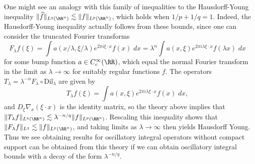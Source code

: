 One might see an analogy with this family of inequalities to the Hausdorff-Young inequality $\| \widehat{f} \|_{L^q(\RR^n)} \lesssim \| f \|_{L^p(\RR^n)}$, which holds when $1/p + 1/q = 1$. Indeed, the Hausdorff-Young inequality actually follows from these bounds, since one can consider the truncated Fourier transforms
%
\[ F_\lambda f(\xi) = \int a(x/\lambda,\xi/\lambda) e^{2 \pi i \xi \cdot x} f(x)\; dx = \lambda^n \int a(x,\xi) e^{2 \pi i \lambda \xi \cdot x} f(\lambda x)\; dx \]
%
for some bump function $a \in C_c^\infty(\RR)$, which equal the normal Fourier transform in the limit as $\lambda \to \infty$ for suitably regular functions $f$. The operators $T_\lambda = \lambda^{-n} F_\lambda \circ \text{Dil}_\lambda$ are given by
%
\[ T_\lambda f(\xi) = \int a(x,\xi) e^{2 \pi i \lambda \xi \cdot x} f(x)\; dx, \]
%
and $D_\xi \nabla_x(\xi \cdot x)$ is the identity matrix, so the theory above implies that $\| T_\lambda f \|_{L^q(\RR^n)} \lesssim \lambda^{-n/q} \| f \|_{L^p(\RR^n)}$. Rescaling this inequality shows that $\| F_\lambda f \|_{L^q} \lesssim \| f \|_{L^p(\RR^n)}$, and taking limits as $\lambda \to \infty$ then yields Hausdorff Young. Thus we see obtaining results for oscillatory integral operators without compact support can be obtained from this theory if we can obtain oscillatory integral bounds with a decay of the form $\lambda^{-n/q}$.

